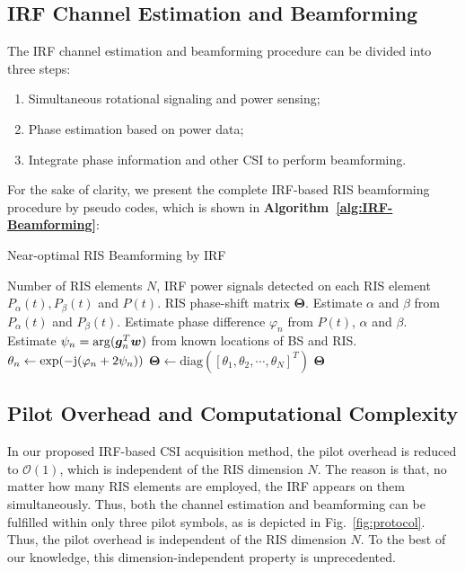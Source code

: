 \documentclass[conference,10pt,twocolumn]{IEEEtran}
\theoremstyle{nonumberplain}
\def \diag {\text{diag}}
\def \exp {\text{exp}}
\begin{document}
\subsection{IRF Channel Estimation and Beamforming} \label{IRF Channel Estimation and Beamforming}
    The \ac{IRF} channel estimation and beamforming procedure can be divided into three steps:
    \begin{enumerate}
        \item Simultaneous rotational signaling and power sensing; 
        \item Phase estimation based on power data;
        \item Integrate phase information and other CSI to perform beamforming. 
    \end{enumerate} 
    For the sake of clarity, we present the complete IRF-based RIS beamforming procedure by pseudo codes, which is shown in {\bf Algorithm~\ref{alg:IRF-Beamforming}}:
    \begin{algorithm}[H] 
        \caption{Near-optimal RIS Beamforming by IRF} \label{alg:IRF-Beamforming}
        \begin{algorithmic}[1]
            \REQUIRE Number of RIS elements $N$, IRF power signals detected on each RIS element $P_{\alpha}(t), P_{\beta}(t)$ and $P(t)$.
            \ENSURE RIS phase-shift matrix ${\bm \Theta}$.
                \STATE Estimate $\alpha$ and $\beta$ from $P_{\alpha}(t)$ and $P_{\beta}(t)$.
                \STATE Estimate phase difference $\varphi_n$ from $P(t)$, $\alpha$ and $\beta$. 
                \STATE Estimate $\psi_{n} = {\rm arg}(\bm g_{n}^{T}\bm w)$ from known locations of BS and RIS.
                \STATE $\theta_n \leftarrow \exp(-{\rm j}(\varphi_n + 2\psi_n))$
            \ENDFOR
            \STATE ${\bm \Theta} \leftarrow \diag\left(\left[\theta_1, \theta_2, \cdots, \theta_N\right]^{T}\right)$
            \RETURN ${\bm \Theta}$
        \end{algorithmic}
    \end{algorithm}

\subsection{Pilot Overhead and Computational Complexity}\label{Pilot Overhead}
    In our proposed IRF-based CSI acquisition method, the pilot overhead is reduced to $\mathcal{O}(1)$, which is independent of the RIS dimension $N$. 
    The reason is that, no matter how many RIS elements are employed, the IRF appears on them simultaneously. 
    Thus, both the channel estimation and beamforming can be fulfilled within only three pilot symbols, as is depicted in Fig.~\ref{fig:protocol}. 
    Thus, the pilot overhead is independent of the RIS dimension $N$. 
    To the best of our knowledge, this dimension-independent property is unprecedented. 
    
\end{document}
